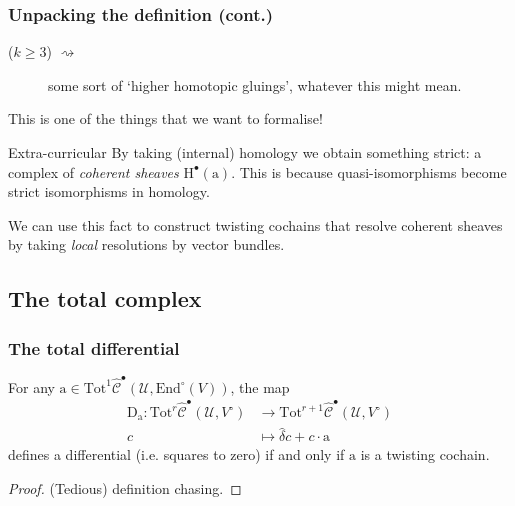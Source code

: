\documentclass{beamer}
\begin{document}
            \begin{frame}\frametitle{Unpacking the definition (cont.)}
                \begin{description}
                    \item[($k\geqslant3$) $\rightsquigarrow$] some sort of `higher homotopic gluings', whatever this might mean.
                \end{description}

                \pause

                This is one of the things that we want to formalise!

                \pause

                \begin{block}{Extra-curricular}
                    By taking (internal) homology we obtain something strict: a complex of \emph{coherent sheaves} $\mathrm{H}^\bullet(\mathrm{a})$.
                    This is because quasi-isomorphisms become strict isomorphisms in homology.

                    We can use this fact to construct twisting cochains that resolve coherent sheaves by taking \emph{local} resolutions by vector bundles.
                \end{block}
            \end{frame}

        \subsection{The total complex}

            \begin{frame}\frametitle{The total differential}
                \begin{lemma}
                    For any $\mathrm{a}\in\mathrm{Tot}^1\hat{\mathscr{C}}^\bullet(\mathcal{U},\mathrm{End}^\circ(V))$, the map
                    \begin{align*}
                        \mathrm{D}_\mathrm{a} \colon \mathrm{Tot}^r\hat{\mathscr{C}}^\bullet(\mathcal{U},V^\circ) &\to \mathrm{Tot}^{r+1}\hat{\mathscr{C}}^\bullet(\mathcal{U},V^\circ)\\
                        c &\mapsto \hat{\delta}c+c\cdot\mathrm{a}
                    \end{align*}
                    defines a differential (i.e. squares to zero) if and only if $\mathrm{a}$ is a twisting cochain.
                \end{lemma}
                \begin{proof}
                    (Tedious) definition chasing.
                \end{proof}
            \end{frame}
\end{document}
